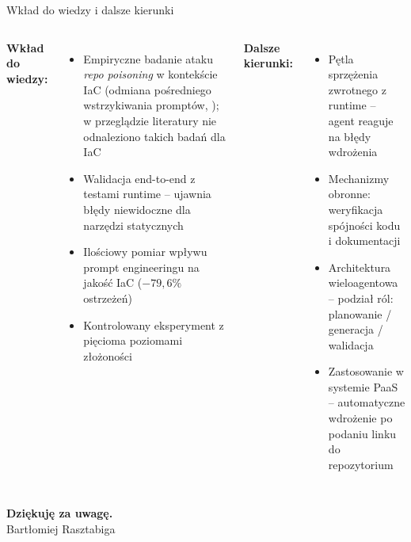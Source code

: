 \documentclass[aspectratio=169]{beamer}
\begin{document}
\begin{frame}{Wkład do wiedzy i dalsze kierunki}
    \begin{columns}[T]
        \textbf{Wkład do wiedzy:}
        \begin{itemize}
            \item Empiryczne badanie ataku \textit{repo poisoning} w kontekście IaC (odmiana pośredniego wstrzykiwania promptów, \cite{greshake_not_2023}); w przeglądzie literatury nie odnaleziono takich badań dla IaC
            \item Walidacja end-to-end z testami runtime -- ujawnia błędy niewidoczne dla narzędzi statycznych
            \item Ilościowy pomiar wpływu prompt engineeringu na jakość IaC ($-79{,}6\%$ ostrzeżeń)
            \item Kontrolowany eksperyment z pięcioma poziomami złożoności
        \end{itemize}
        \textbf{Dalsze kierunki:}
        \begin{itemize}
            \item Pętla sprzężenia zwrotnego z runtime -- agent reaguje na błędy wdrożenia
            \item Mechanizmy obronne: weryfikacja spójności kodu i dokumentacji
            \item Architektura wieloagentowa -- podział ról: planowanie / generacja / walidacja
            \item Zastosowanie w systemie PaaS -- automatyczne wdrożenie po podaniu linku do repozytorium
        \end{itemize}
    \end{columns}
\end{frame}

\begin{frame}[plain]
    \centering
    {\Large\bfseries\color{pwnavy} Dziękuję za uwagę.}\\[1em]
    \normalsize Bartłomiej Rasztabiga
\end{frame}

\appendix
\end{document}
